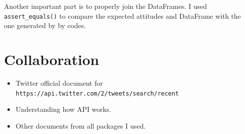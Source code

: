 \documentclass[a4paper, 12pt]{article}
\begin{document}
Another important part is to properly join the DataFrames. I used \texttt{assert\_equals()} to compare the expected attitudes and DataFrame with the one generated by by codes.

\section*{Collaboration}
\begin{itemize}
    \item Twitter official document for \texttt{https://api.twitter.com/2/tweets/search/recent}
    \item Understanding how API works.
    \item Other documents from all packages I used.
\end{itemize}
\end{document}
